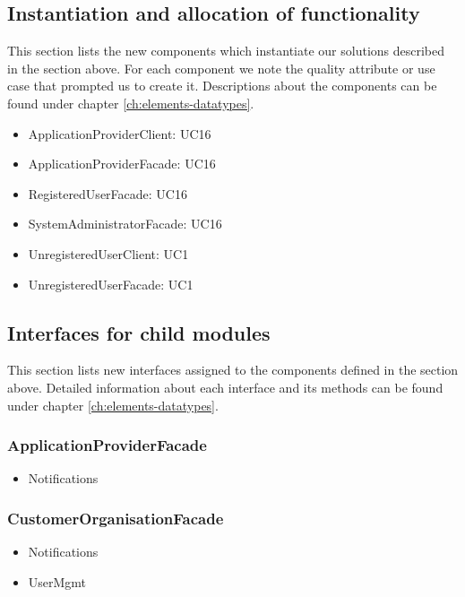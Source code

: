 \subsection{Instantiation and allocation of functionality}
    This section lists the new components which instantiate our solutions
    described in the section above. For each component we note the quality
    attribute or use case that prompted us to create it. Descriptions about
    the components can be found under chapter \ref{ch:elements-datatypes}. \\

    \begin{itemize}
        \item ApplicationProviderClient: UC16
        \item ApplicationProviderFacade: UC16
        \item RegisteredUserFacade: UC16
        \item SystemAdministratorFacade: UC16
        \item UnregisteredUserClient: UC1
        \item UnregisteredUserFacade: UC1
    \end{itemize}


\subsection{Interfaces for child modules}
    This section lists new interfaces assigned to the components defined
    in the section above. Detailed information about each interface and
    its methods can be found under chapter \ref{ch:elements-datatypes}.

    \subsubsection{ApplicationProviderFacade}
        \begin{itemize}
            \item Notifications
        \end{itemize}

    \subsubsection{CustomerOrganisationFacade}
        \begin{itemize}
            \item Notifications
            \item UserMgmt
        \end{itemize}

